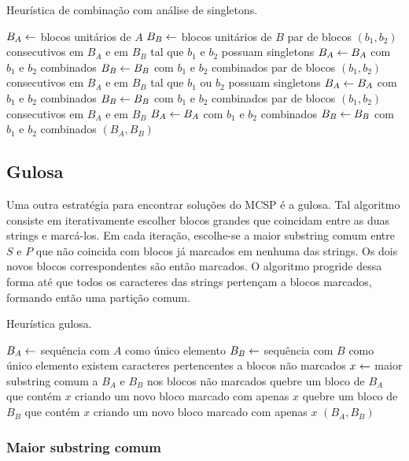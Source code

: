         \begin{algorithm}[htb]
        \caption{Heurística de combinação com análise de singletons.} \label{alg:combineS}
        \begin{codebox}
        \li $B_A \leftarrow$ blocos unitários de $A$
        \li $B_B \leftarrow$ blocos unitários de $B$
        \li \Para \Cada par de blocos $(b_1, b_2)$ consecutivos em $B_A$ e em $B_B$
        \zi tal que $b_1$ e $b_2$ possuam singletons \Faca
            \Do
        \li     $B_A \leftarrow B_A$ com $b_1$ e $b_2$ combinados
        \li     $B_B \leftarrow B_B$ com $b_1$ e $b_2$ combinados
            \End
        \li \Para \Cada par de blocos $(b_1, b_2)$ consecutivos em $B_A$ e em $B_B$
        \zi tal que $b_1$ ou $b_2$ possuam singletons \Faca
            \Do
        \li     $B_A \leftarrow B_A$ com $b_1$ e $b_2$ combinados
        \li     $B_B \leftarrow B_B$ com $b_1$ e $b_2$ combinados
            \End
        \li \Para \Cada par de blocos $(b_1, b_2)$ consecutivos em $B_A$ e em $B_B$ \Faca
            \Do
        \li     $B_A \leftarrow B_A$ com $b_1$ e $b_2$ combinados
        \li     $B_B \leftarrow B_B$ com $b_1$ e $b_2$ combinados
            \End
        \li \Devolva $(B_A, B_B)$
        \end{codebox}
    \end{algorithm}

\subsection{Gulosa}

    Uma outra estratégia para encontrar soluções do MCSP é a gulosa. Tal algoritmo consiste em iterativamente escolher blocos grandes que coincidam entre as duas strings e marcá-los. Em cada iteração, escolhe-se a maior substring comum entre $S$ e $P$ que não coincida com blocos já marcados em nenhuma das strings. Os dois novos blocos correspondentes são então marcados. O algoritmo progride dessa forma até que todos os caracteres das strings pertençam a blocos marcados, formando então uma partição comum.

    \begin{algorithm}[htb]
        \caption{Heurística gulosa.} \label{alg:greedy}
        \begin{codebox}
        \li $B_A \leftarrow$ sequência com $A$ como único elemento
        \li $B_B \leftarrow$ sequência com $B$ como único elemento
        \li \Enquanto existem caracteres pertencentes a blocos não marcados \Faca
            \Do
        \li     $x \leftarrow$ maior substring comum a $B_A$ e $B_B$ nos blocos não marcados
        \li     quebre um bloco de $B_A$ que contém $x$ criando um novo bloco marcado com apenas $x$
        \li     quebre um bloco de $B_B$ que contém $x$ criando um novo bloco marcado com apenas $x$
            \End
        \li \Devolva $(B_A, B_B)$
        \end{codebox}
    \end{algorithm}

    \subsubsection{Maior substring comum}

